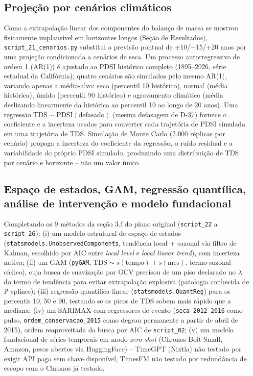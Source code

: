 \subsection{Projeção por cenários climáticos}

Como a extrapolação linear dos componentes do balanço de massa se mostrou fisicamente implausível em horizontes longos (Seção de Resultados), \texttt{script\_21\_cenarios.py} substitui a previsão pontual de +10/+15/+20 anos por uma projeção condicionada a cenários de seca. Um processo autorregressivo de ordem 1 (AR(1)) é ajustado ao PDSI histórico completo (1895--2026, série estadual da Califórnia); quatro cenários são simulados pelo mesmo AR(1), variando apenas a média-alvo: seco (percentil 10 histórico), normal (média histórica), úmido (percentil 90 histórico) e agravamento climático (média deslizando linearmente da histórica ao percentil 10 ao longo de 20 anos). Uma regressão $\mathrm{TDS} \sim \mathrm{PDSI}(\text{defasado})$ (mesma defasagem de D-37) fornece o coeficiente e a incerteza usados para converter cada trajetória de PDSI simulada em uma trajetória de TDS. Simulação de Monte Carlo (2.000 réplicas por cenário) propaga a incerteza do coeficiente da regressão, o ruído residual e a variabilidade do próprio PDSI simulado, produzindo uma distribuição de TDS por cenário e horizonte -- não um valor único.

\subsection{Espaço de estados, GAM, regressão quantílica, análise de intervenção e modelo fundacional}

Completando os 9 métodos da seção 3.f do plano original (\texttt{script\_22} a \texttt{script\_26}): (i) um modelo estrutural de espaço de estados (\texttt{statsmodels.UnobservedComponents}, tendência local + sazonal via filtro de Kalman, escolhido por AIC entre \textit{local level} e \textit{local linear trend}), com incerteza nativa; (ii) um GAM (\texttt{pyGAM}, $\mathrm{TDS} \sim s(\mathrm{tempo}) + s(\mathrm{mes})$, termo sazonal cíclico), cuja busca de suavização por GCV precisou de um piso declarado no $\lambda$ do termo de tendência para evitar extrapolação explosiva (patologia conhecida de P-splines); (iii) regressão quantílica linear (\texttt{statsmodels.QuantReg}) para os percentis 10, 50 e 90, testando se os picos de TDS sobem mais rápido que a mediana; (iv) um SARIMAX com regressores de evento (\texttt{seca\_2012\_2016} como pulso, \texttt{ordem\_conservacao\_2015} como degrau permanente a partir de abril de 2015), ordem reaproveitada da busca por AIC de \texttt{script\_02}; (v) um modelo fundacional de séries temporais em modo \textit{zero-shot} (Chronos-Bolt-Small, Amazon, pesos abertos via HuggingFace) -- TimeGPT (Nixtla) não testado por exigir API paga sem chave disponível, TimesFM não testado por redundância de escopo com o Chronos já testado.

